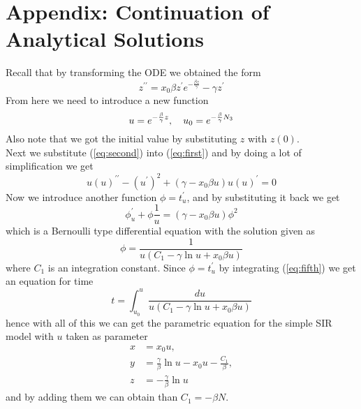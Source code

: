 \section{Appendix: Continuation of Analytical Solutions}\label{appendix-b}\thispagestyle{SectionFirstPage} %
\setcounter{figure}{0}
\setcounter{table}{0}
Recall that by transforming the ODE we obtained the form
\begin{equation} \label{eq:first}
	z^{\prime\prime} = x_{0} \beta z^{\prime} e^{-\frac{\beta z}{\gamma}} - \gamma z^{\prime}
\end{equation}
From here we need to introduce a new function 
\begin{equation} \label{eq:second}
	u = e^{-\frac{\beta}{\gamma}z}, \quad u_0 = e^{-\frac{\beta}{\gamma}N_3}\\
\end{equation}
Also note that we got the initial value by substituting $z$ with $z(0)$.\\
Next we substitute (\ref{eq:second}) into (\ref{eq:first}) and by doing a lot of simplification we get
\begin{equation} \label{eq:third}
	u(u)^{\prime\prime} - (u^{\prime})^2 + (\gamma - x_0\beta u)u(u)^\prime = 0
\end{equation}
Now we introduce another function $\phi = t^{\prime}_{u}$, and by substituting it back we get
\begin{equation} \label{eq:forth}
	\phi^{\prime}_u + \phi\frac{1}{u} = (\gamma-x_0\beta u)\phi^2
\end{equation}
which is a Bernoulli type differential equation with the solution given as
\begin{equation} \label{eq:fifth}
	\phi = \frac{1}{u(C_1-\gamma \ln u + x_0\beta u)}
\end{equation}
where $C_1$ is an integration constant. Since $\phi = t^{\prime}_{u}$ by integrating (\ref{eq:fifth}) we get an equation for time
\begin{equation} \label{eq:sixth}
	t = \int_{u_0}^{u} \frac{du}{u(C_1-\gamma \ln u + x_0\beta u)}
\end{equation}
hence with all of this we can get the parametric equation for the simple SIR model with $u$ taken as parameter
\begin{align*} \label{eq:parameter}
	x &= x_0u,\\
	y &= \frac{\gamma}{\beta}\ln u - x_0u - \frac{C_1}{\beta},\\
	z &= -\frac{\gamma}{\beta}\ln u
\end{align*}
and by adding them we can obtain than $C_1 = -\beta N$.
